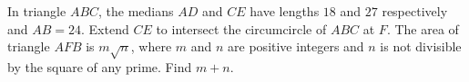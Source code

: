 In triangle $ABC$, the medians $AD$ and $CE$ have lengths $18$ and $27$ respectively and $AB=24$. Extend $CE$ to intersect the circumcircle of $ABC$ at $F$. The area of triangle $AFB$ is $m\sqrt{n}$, where $m$ and $n$ are positive integers and $n$ is not divisible by the square of any prime. Find $m+n$. 